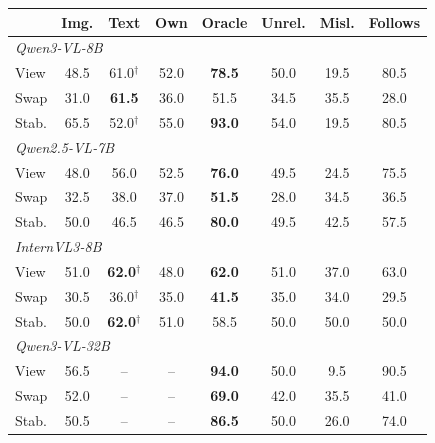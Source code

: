 \begin{tabular}{lccccccc}
\toprule
 & Img. & Text & Own & Oracle & Unrel. & Misl. & Follows \\
\midrule
\multicolumn{8}{l}{\emph{Qwen3-VL-8B}} \\
\quad View & 48.5 & 61.0$^\dagger$ & 52.0 & \textbf{78.5} & 50.0 & 19.5 & 80.5 \\
\quad Swap & 31.0 & \textbf{61.5} & 36.0 & 51.5 & 34.5 & 35.5 & 28.0 \\
\quad Stab. & 65.5 & 52.0$^\dagger$ & 55.0 & \textbf{93.0} & 54.0 & 19.5 & 80.5 \\
\midrule
\multicolumn{8}{l}{\emph{Qwen2.5-VL-7B}} \\
\quad View & 48.0 & 56.0 & 52.5 & \textbf{76.0} & 49.5 & 24.5 & 75.5 \\
\quad Swap & 32.5 & 38.0 & 37.0 & \textbf{51.5} & 28.0 & 34.5 & 36.5 \\
\quad Stab. & 50.0 & 46.5 & 46.5 & \textbf{80.0} & 49.5 & 42.5 & 57.5 \\
\midrule
\multicolumn{8}{l}{\emph{InternVL3-8B}} \\
\quad View & 51.0 & \textbf{62.0}$^\dagger$ & 48.0 & \textbf{62.0} & 51.0 & 37.0 & 63.0 \\
\quad Swap & 30.5 & 36.0$^\dagger$ & 35.0 & \textbf{41.5} & 35.0 & 34.0 & 29.5 \\
\quad Stab. & 50.0 & \textbf{62.0}$^\dagger$ & 51.0 & 58.5 & 50.0 & 50.0 & 50.0 \\
\midrule
\multicolumn{8}{l}{\emph{Qwen3-VL-32B}} \\
\quad View & 56.5 & -- & -- & \textbf{94.0} & 50.0 & 9.5 & 90.5 \\
\quad Swap & 52.0 & -- & -- & \textbf{69.0} & 42.0 & 35.5 & 41.0 \\
\quad Stab. & 50.5 & -- & -- & \textbf{86.5} & 50.0 & 26.0 & 74.0 \\
\bottomrule
\end{tabular}
